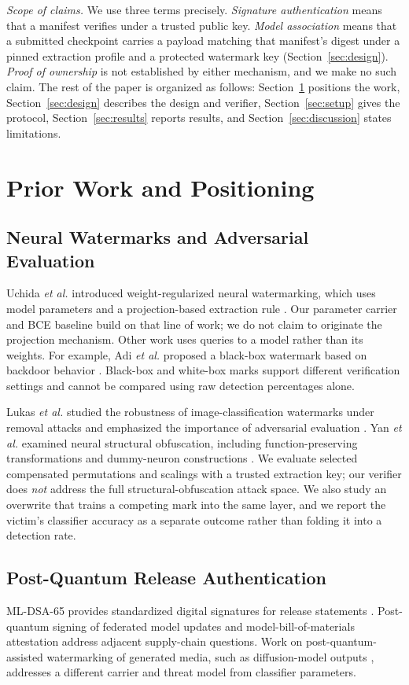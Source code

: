 \documentclass[conference]{IEEEtran}
\begin{document}
\emph{Scope of claims.} We use three terms precisely. \emph{Signature
authentication} means that a manifest verifies under a trusted public key.
\emph{Model association} means that a submitted checkpoint carries a payload
matching that manifest's digest under a pinned extraction profile and a
protected watermark key (Section~\ref{sec:design}). \emph{Proof of ownership}
is not established by either mechanism, and we make no such claim. The rest of
the paper is organized as follows: Section~\ref{sec:related} positions the work,
Section~\ref{sec:design} describes the design and verifier,
Section~\ref{sec:setup} gives the protocol, Section~\ref{sec:results} reports
results, and Section~\ref{sec:discussion} states limitations.

\section{Prior Work and Positioning}
\label{sec:related}
\subsection{Neural Watermarks and Adversarial Evaluation}
Uchida \emph{et al.} introduced weight-regularized neural watermarking, which
uses model parameters and a projection-based extraction rule
\cite{uchida2017embedding}. Our parameter carrier and BCE baseline build on
that line of work; we do not claim to originate the projection mechanism.
Other work uses queries to a model rather than its weights. For example, Adi
\emph{et al.} proposed a black-box watermark based on backdoor behavior
\cite{adi2018backdooring}. Black-box and white-box marks support different
verification settings and cannot be compared using raw detection percentages
alone.

Lukas \emph{et al.} studied the robustness of image-classification
watermarks under removal attacks and emphasized the importance of adversarial
evaluation \cite{lukas2022sok}. Yan \emph{et al.} examined neural structural
obfuscation, including function-preserving transformations and dummy-neuron
constructions \cite{yan2023rethinking}. We evaluate selected compensated
permutations and scalings with a trusted extraction key; our verifier does
\emph{not} address the full structural-obfuscation attack space. We also study
an overwrite that trains a competing mark into the same layer, and we report
the victim's classifier accuracy as a separate outcome rather than folding it
into a detection rate.

\subsection{Post-Quantum Release Authentication}
ML-DSA-65 provides standardized digital signatures for release statements
\cite{nist204}. Post-quantum signing of federated model updates
\cite{li2024federated} and model-bill-of-materials attestation
\cite{campbell2026mbom} address adjacent supply-chain questions. Work on
post-quantum-assisted watermarking of generated media, such as diffusion-model
outputs \cite{hu2026diffusion}, addresses a different carrier and threat
model from classifier parameters.
\end{document}
